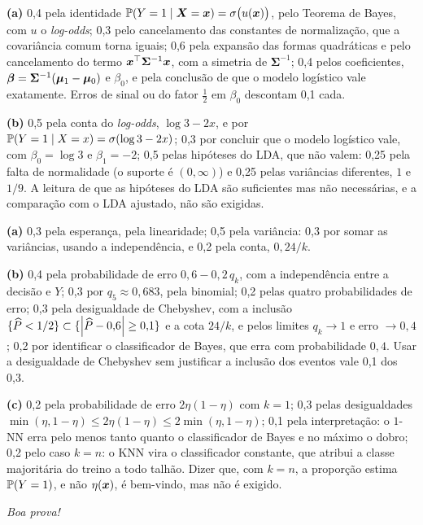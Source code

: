 \documentclass[11pt,a4paper]{article}
\begin{document}
\begin{criterio}
\textbf{(a)} 0,4 pela identidade $\mathbb{P}(Y=1\mid\bm{X}=\bm{x})=\sigma\big(u(\bm{x})\big)$, pelo Teorema
de Bayes, com $u$ o \emph{log-odds}; 0,3 pelo cancelamento das constantes de
normalização, que a covariância comum torna iguais; 0,6 pela expansão das formas
quadráticas e pelo cancelamento do termo $\bm{x}^\top\bm\Sigma^{-1}\bm{x}$, com a simetria de
$\bm\Sigma^{-1}$; 0,4 pelos coeficientes, $\bm{\beta}=\bm\Sigma^{-1}(\bm\mu_1-\bm\mu_0)$ e
$\beta_0$, e pela conclusão de que o modelo logístico vale exatamente. Erros de sinal ou
do fator $\tfrac12$ em $\beta_0$ descontam 0,1 cada.

\textbf{(b)} 0,5 pela conta do \emph{log-odds}, $\log3-2x$, e por
$\mathbb{P}(Y=1\mid X=x)=\sigma(\log3-2x)$; 0,3 por concluir que o modelo logístico vale, com
$\beta_0=\log3$ e $\beta_1=-2$; 0,5 pelas hipóteses do LDA, que não valem: 0,25 pela falta
de normalidade (o suporte é $(0,\infty)$) e 0,25 pelas variâncias diferentes, $1$ e
$1/9$. A leitura de que as hipóteses do LDA são suficientes mas não necessárias, e a
comparação com o LDA ajustado, não são exigidas.
\end{criterio}



\begin{criterio}
\textbf{(a)} 0,3 pela esperança, pela linearidade; 0,5 pela variância: 0,3 por somar as
variâncias, usando a independência, e 0,2 pela conta, $0{,}24/k$.

\textbf{(b)} 0,4 pela probabilidade de erro $0{,}6-0{,}2\,q_k$, com a independência entre
a decisão e $Y$; 0,3 por $q_5\approx0{,}683$, pela binomial; 0,2 pelas quatro
probabilidades de erro; 0,3 pela desigualdade de Chebyshev, com a inclusão
$\{\widehat P<1/2\}\subset\{\left\lvert \widehat P-0{,}6 \right\rvert\ge0{,}1\}$ e a cota $24/k$, e pelos
limites $q_k\to1$ e erro $\to0{,}4$; 0,2 por identificar o classificador de Bayes, que erra
com probabilidade $0{,}4$. Usar a desigualdade de Chebyshev sem justificar a inclusão dos
eventos vale 0,1 dos 0,3.

\textbf{(c)} 0,2 pela probabilidade de erro $2\eta(1-\eta)$ com $k=1$; 0,3 pelas
desigualdades $\min(\eta,1-\eta)\le2\eta(1-\eta)\le2\min(\eta,1-\eta)$; 0,1 pela
interpretação: o $1$-NN erra pelo menos tanto quanto o classificador de Bayes e no máximo
o dobro; 0,2 pelo caso $k=n$: o KNN vira o classificador constante, que atribui a classe
majoritária do treino a todo talhão. Dizer que, com $k=n$, a proporção estima $\mathbb{P}(Y=1)$,
e não $\eta(\bm{x})$, é bem-vindo, mas não é exigido.
\end{criterio}

\vfill
\begin{center}\small\itshape Boa prova!\end{center}
\end{document}
